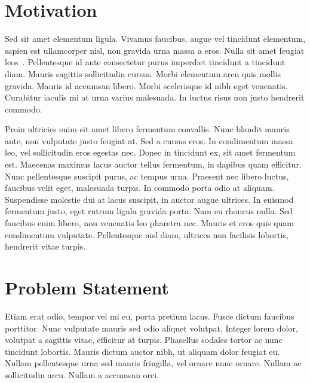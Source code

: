 
\section{Motivation}
\label{sec:motivation}

Sed sit amet elementum ligula. Vivamus faucibus, augue vel tincidunt elementum, sapien est ullamcorper nisl, non gravida urna massa a eros. Nulla sit amet feugiat leos~\cite{Gray2000aa}. Pellentesque id ante consectetur purus imperdiet tincidunt a tincidunt diam. Mauris sagittis sollicitudin cursus. Morbi elementum arcu quis mollis gravida. Mauris id accumsan libero. Morbi scelerisque id nibh eget venenatis. Curabitur iaculis mi at urna varius malesuada. In luctus risus non justo hendrerit commodo. \newline

Proin ultricies enim sit amet libero fermentum convallis. Nunc blandit mauris ante, non vulputate justo feugiat at. Sed a cursus eros. In condimentum massa leo, vel sollicitudin eros egestas nec. Donec in tincidunt ex, sit amet fermentum est. Maecenas maximus lacus auctor tellus fermentum, in dapibus quam efficitur. Nunc pellentesque suscipit purus, ac tempus urna. Praesent nec libero luctus, faucibus velit eget, malesuada turpis. In commodo porta odio at aliquam. Suspendisse molestie dui at lacus suscipit, in auctor augue ultrices. In euismod fermentum justo, eget rutrum ligula gravida porta. Nam eu rhoncus nulla. Sed faucibus enim libero, non venenatis leo pharetra nec. Mauris et eros quis quam condimentum vulputate. Pellentesque nisl diam, ultrices non facilisis lobortis, hendrerit vitae turpis. \newline



\section{Problem Statement}
\label{sec:problem_statement}

Etiam erat odio, tempor vel mi eu, porta pretium lacus. Fusce dictum faucibus porttitor. Nunc vulputate mauris sed odio aliquet volutpat. Integer lorem dolor, volutpat a sagittis vitae, efficitur at turpis. Phasellus sodales tortor ac nunc tincidunt lobortis. Mauris dictum auctor nibh, ut aliquam dolor feugiat eu. Nullam pellentesque urna sed mauris fringilla, vel ornare nunc ornare. Nullam ac sollicitudin arcu. Nullam a accumsan orci. \newline

